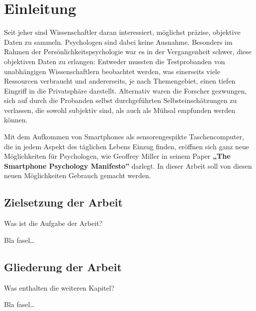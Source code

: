 
\chapter{Einleitung}
\label{ch:Einleitung}

Seit jeher sind Wissenschaftler daran interessiert, möglichst präzise, objektive Daten zu sammeln.
Psychologen sind dabei keine Ausnahme.
Besonders im Rahmen der Persönlichkeitspsychologie war es in der Vergangenheit schwer, diese objektiven Daten zu erlangen:
Entweder mussten die Testprobanden von unabhängigen Wissenschaftlern beobachtet werden,
was einerseits viele Ressourcen verbraucht und andererseits, je nach Themengebiet,
einen tiefen Eingriff in die Privatsphäre darstellt. Alternativ waren die Forscher gezwungen,
sich auf durch die Probanden selbst durchgeführten Selbsteinschätzungen zu verlassen,
die sowohl subjektiv sind, als auch als Mühsal empfunden werden können.\par

Mit dem Aufkommen von Smartphones als sensorengespikte Taschencomputer, die in jedem Aspekt des täglichen Lebens Einzug finden,
eröffnen sich ganz neue Möglichkeiten für Psychologen, wie Geoffrey Miller in seinem Paper \textbf{„The Smartphone Psychology Manifesto”} 
darlegt. In dieser Arbeit soll von diesen neuen Möglichkeiten Gebrauch gemacht werden.\par




\section{Zielsetzung der Arbeit}
\label{ch:Einleitung:sec:Zielsetzung}

Was ist die Aufgabe der Arbeit?

Bla fasel\ldots

\section{Gliederung der Arbeit}
\label{ch:Einleitung:sec:Gliederung}

Was enthalten die weiteren Kapitel?

Bla fasel\ldots

